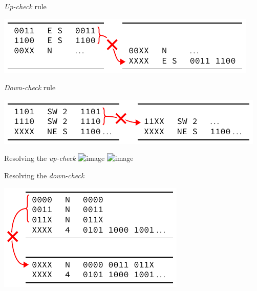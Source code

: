 \documentclass[t]{beamer}
\begin{document}
\begin{frame}{\emph{Up-check} rule}
  \begin{center}
    \includegraphics{../figures/rule2a_example}
  \end{center}
\end{frame}

\begin{frame}{\emph{Down-check} rule}
  \begin{center}
    \includegraphics{../figures/rule2b_example}
  \end{center}
\end{frame}

\begin{frame}{Resolving the \emph{up-check}}
  \includegraphics<1>{../figures/upcheck_resolve_example_1}
  \includegraphics<2>{../figures/upcheck_resolve_example_2}
\end{frame}

\begin{frame}{Resolving the \emph{down-check}}
  \begin{center}
    \includegraphics{../figures/downcheck_resolve_example_1}
  \end{center}
\end{frame}
\end{document}
